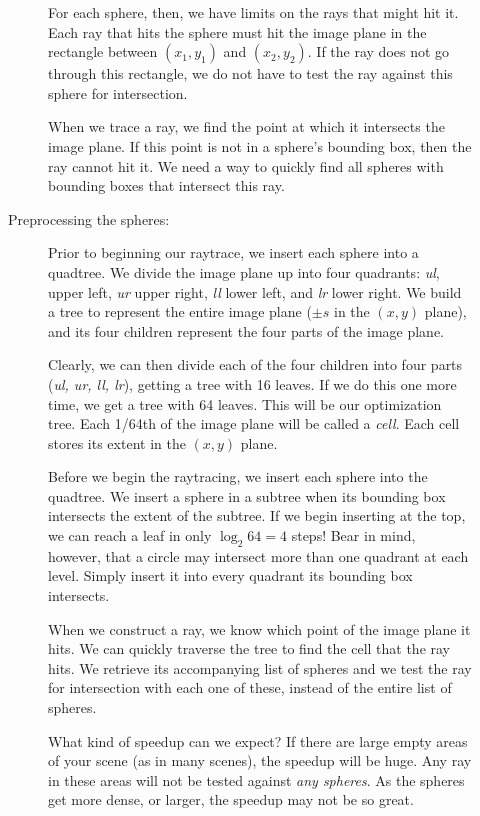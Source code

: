 \documentclass{article}
\begin{document}
\begin{description}
\begin{description}
For each sphere, then, we have limits on the rays that might hit it.
Each ray that hits the sphere must hit the image plane in the
rectangle between $(x_1,y_1)$ and $(x_2, y_2)$.  If the ray does not
go through this rectangle, we do not have to test the ray against this
sphere for intersection.

When we trace a ray, we find the point at which it intersects the
image plane.  If this point is not in a sphere's bounding box, then
the ray cannot hit it.  We need a way to quickly find all spheres with
bounding boxes that intersect this ray.

\item[Preprocessing the spheres:]
  Prior to beginning our raytrace, we insert each sphere into a quadtree.
  We divide the image plane up into four quadrants: {\em ul}, upper
  left, {\em ur} upper right, {\em ll} lower left, and {\em lr} lower
  right.  We build a tree to represent the entire image plane ($\pm s$
  in the $(x,y)$ plane), and its four children represent the four parts
  of the image plane.

  Clearly, we can then divide each of the four children into four
  parts ({\em ul, ur, ll, lr}), getting a tree with 16 leaves.  If we
  do this one more time, we get a tree with 64 leaves.  This will be
  our optimization tree.  Each 1/64th of the image plane will be
  called a {\em cell}.  Each cell stores its extent in the $(x,y)$
  plane. 

  Before we begin the raytracing, we insert each sphere into the
  quadtree.  We insert a sphere in a subtree when its bounding box
  intersects the extent of the subtree.
  If we begin inserting at the top, we can reach a leaf in
  only $\log_2 64 = 4$ steps!  Bear in mind, however, that a circle
  may intersect more than one quadrant at each level.  Simply insert
  it into every quadrant its bounding box intersects.

  When we construct a ray, we know which point of the image plane it
  hits.  We can quickly traverse the tree to find the cell that the
  ray hits.  We retrieve its accompanying list of spheres and we test
  the ray for intersection with each one of these, instead of the
  entire list of spheres.

  What kind of speedup can we expect?  If there are large empty areas
  of your scene (as in many scenes), the speedup will be huge.  Any
  ray in these areas will not be tested against {\em any spheres}.  As
  the spheres get more dense, or larger, the speedup may not be so
  great. 


\end{description}
\end{description}
\end{document}
